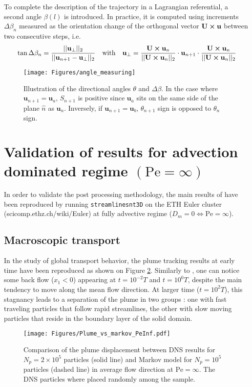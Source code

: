 To complete the description of the trajectory in a Lagrangian referential, a second angle $\beta(l)$ is introduced. In practice, it is computed using increments $\Delta \beta_n$ measured as the orientation change of the orthogonal vector $\textbf{U}\cross \textbf{u}$ between two consecutive steps, i.e.
\begin{equation}
\tan\Delta\beta_n = \frac{||\textbf{u}_\perp||_2}{||\textbf{u}_{n+1}-\textbf{u}_\perp||_2}
\quad\textrm{with}\quad
\textbf{u}_\perp =\frac{\textbf{U}\cross\textbf{u}_{n}}{||\textbf{U}\cross\textbf{u}_n||_2}\cdot \textbf{u}_{n+1}\cdot\frac{\textbf{U}\cross\textbf{u}_{n}}{||\textbf{U}\cross\textbf{u}_n||_2}
\end{equation}

\begin{figure}
	\centering
	\texttt{[image: Figures/angle\_measuring]}
	\caption{Illustration of the directional angles $\theta$ and $\Delta \beta$. In the case where $\textbf{u}_{n+1} = \textbf{u}_a$, $S_{n+1}$ is positive since $\textbf{u}_a$ sits on the same side of the plane $\hat{n}$ as $\textbf{u}_n$. Inversely, if $\textbf{u}_{n+1} = \textbf{u}_b$, $\theta_{n+1}$ sign is opposed to $\theta_n$ sign. }
	\label{fig:anglemeasuring}
\end{figure}

\section{Validation of \cite{Meyer2016} results for advection dominated regime $(\mathrm{Pe}=\infty)$}
In order to validate the post processing methodology, the main results of \cite{Meyer2016} have been reproduced by running \texttt{streamlinesnt3D} on the ETH Euler cluster (scicomp.ethz.ch/wiki/Euler) at fully advective regime ($D_m=0\Leftrightarrow\mathrm{Pe}=\infty$).
\subsection{Macroscopic transport}
In the study of global transport behavior, the plume tracking results at early time have been reproduced as shown on Figure \ref{fig:plume_peinf}. 
Similarly to \cite{Meyer2016}, one can notice some back flow ($x_1<0$) appearing at $t=10^{-2}T$ and $t=10^0T$, despite the main tendency to move along the mean flow direction.  
At larger time ($t=10^2T$), this stagnancy leads to a separation of the plume in two groups : one with fast traveling particles that follow rapid streamlines, the other with slow moving particles that reside in the boundary layer of the solid domain.
\begin{figure}[h!]
	\centering
	\texttt{[image: Figures/Plume\_vs\_markov\_PeInf.pdf]}
	\caption{Comparison of the plume displacement between DNS results for $N_p=2\times 10^5$ particles (solid line) and Markov model for $N_p=10^5$ particles (dashed line) in average flow direction at $\mathrm{Pe}=\infty$. The DNS particles where placed randomly among the sample.}
	\label{fig:plume_peinf}
\end{figure}

